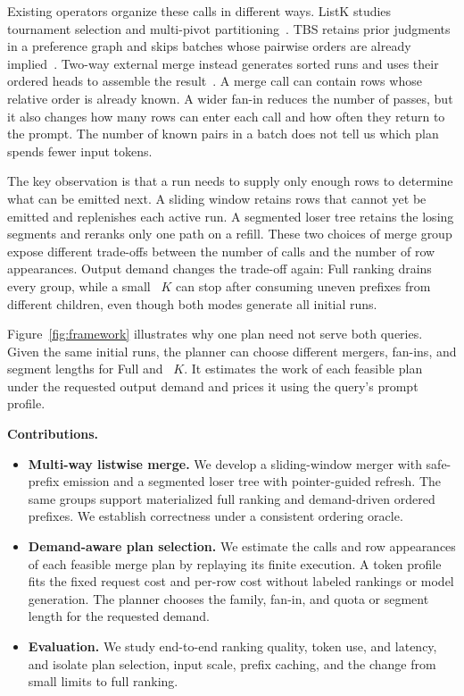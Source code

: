 Existing operators organize these calls in different ways. ListK studies tournament selection and multi-pivot partitioning~\cite{DBLP:journals/corr/abs-2603-17223}. TBS retains prior judgments in a preference graph and skips batches whose pairwise orders are already implied~\cite{akinola2026tbs}. Two-way external merge instead generates sorted runs and uses their ordered heads to assemble the result~\cite{DBLP:journals/corr/abs-2509-00303}. A merge call can contain rows whose relative order is already known. A wider fan-in reduces the number of passes, but it also changes how many rows can enter each call and how often they return to the prompt. The number of known pairs in a batch does not tell us which plan spends fewer input tokens.

The key observation is that a run needs to supply only enough rows to determine what can be emitted next. A sliding window retains rows that cannot yet be emitted and replenishes each active run. A segmented loser tree retains the losing segments and reranks only one path on a refill. These two choices of merge group expose different trade-offs between the number of calls and the number of row appearances. Output demand changes the trade-off again: Full ranking drains every group, while a small \LIMIT~$K$ can stop after consuming uneven prefixes from different children, even though both modes generate all initial runs.

Figure~\ref{fig:framework} illustrates why one plan need not serve both queries. Given the same initial runs, the planner can choose different mergers, fan-ins, and segment lengths for Full and \LIMIT~$K$. It estimates the work of each feasible plan under the requested output demand and prices it using the query's prompt profile.

\textbf{Contributions.}
\begin{itemize}
  \item \textbf{Multi-way listwise merge.} We develop a sliding-window merger with safe-prefix emission and a segmented loser tree with pointer-guided refresh. The same groups support materialized full ranking and demand-driven ordered prefixes. We establish correctness under a consistent ordering oracle.
  \item \textbf{Demand-aware plan selection.} We estimate the calls and row appearances of each feasible merge plan by replaying its finite execution. A token profile fits the fixed request cost and per-row cost without labeled rankings or model generation. The planner chooses the family, fan-in, and quota or segment length for the requested demand.
  \item \textbf{Evaluation.} We study end-to-end ranking quality, token use, and latency, and isolate plan selection, input scale, prefix caching, and the change from small limits to full ranking.
\end{itemize}
